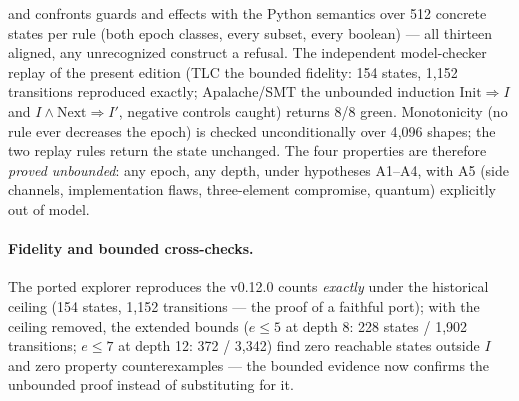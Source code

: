 \documentclass[10pt,a4paper]{article}
\begin{document}
and confronts guards and effects with the Python semantics over 512
concrete states per rule (both epoch classes, every subset, every
boolean) --- all thirteen aligned, any unrecognized construct a refusal.
The independent model-checker replay of the present edition (TLC the
bounded fidelity: 154 states, 1{,}152 transitions reproduced exactly;
Apalache/SMT the unbounded induction
$\mathrm{Init} \Rightarrow I$ and $I \wedge \mathrm{Next} \Rightarrow I'$,
negative controls caught) returns 8/8 green. Monotonicity (no rule ever decreases the epoch)
is checked unconditionally over 4{,}096 shapes; the two replay rules
return the state unchanged. The four properties are therefore
\emph{proved unbounded}: any epoch, any depth, under hypotheses
A1--A4, with A5 (side channels, implementation flaws, three-element
compromise, quantum) explicitly out of model.

\paragraph{Fidelity and bounded cross-checks.} The ported explorer
reproduces the v0.12.0 counts \emph{exactly} under the historical
ceiling (154 states, 1{,}152 transitions --- the proof of a faithful
port); with the ceiling removed, the extended bounds ($e \le 5$ at depth
8: 228 states / 1{,}902 transitions; $e \le 7$ at depth 12: 372 /
3{,}342) find zero reachable states outside $I$ and zero property
counterexamples --- the bounded evidence now confirms the unbounded
proof instead of substituting for it.
\end{document}
